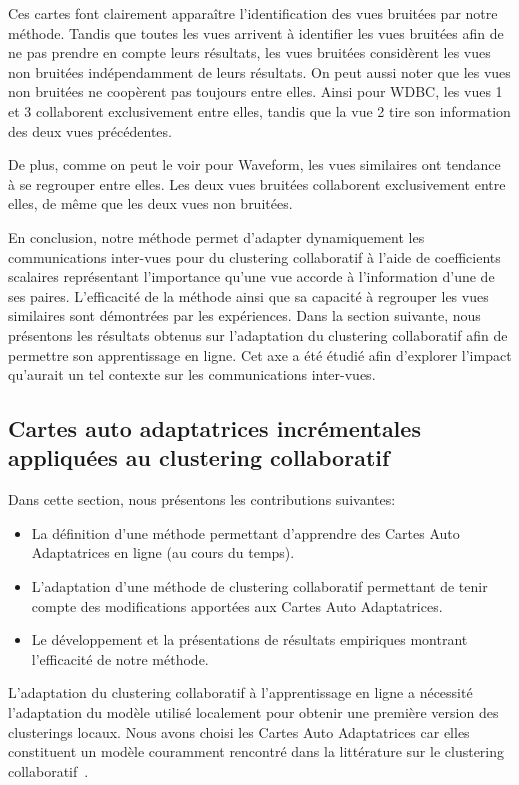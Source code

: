 Ces cartes font clairement apparaître l'identification des vues bruitées par notre méthode. Tandis que toutes les vues arrivent à identifier les vues bruitées afin de ne pas prendre en compte leurs résultats, les vues bruitées considèrent les vues non bruitées indépendamment de leurs résultats. On peut aussi noter que les vues non bruitées ne coopèrent pas toujours entre elles. Ainsi pour WDBC, les vues 1 et 3 collaborent exclusivement entre elles, tandis que la vue 2 tire son information des deux vues précédentes.

De plus, comme on peut le voir pour Waveform, les vues similaires ont tendance à se regrouper entre elles. Les deux vues bruitées collaborent exclusivement entre elles, de m\^{e}me que les deux vues non bruitées.

En conclusion, notre méthode permet d'adapter dynamiquement les communications inter-vues pour du clustering collaboratif à l'aide de coefficients scalaires représentant l'importance qu'une vue accorde à l'information d'une de ses paires. L'efficacité de la méthode ainsi que sa capacité à regrouper les vues similaires sont démontrées par les expériences. Dans la section suivante, nous présentons les résultats obtenus sur l'adaptation du clustering collaboratif afin de permettre son apprentissage en ligne. Cet axe a été étudié afin d'explorer l'impact qu'aurait un tel contexte sur les communications inter-vues.

\subsection{Cartes auto adaptatrices incr\'{e}mentales appliqu\'{e}es au clustering collaboratif}

Dans cette section, nous présentons les contributions suivantes:
\begin{itemize}
    \item La définition d'une méthode permettant d'apprendre des Cartes Auto Adaptatrices en ligne (au cours du temps).
    \item L'adaptation d'une méthode de clustering collaboratif permettant de tenir compte des modifications apportées aux Cartes Auto Adaptatrices.
    \item Le développement et la présentations de résultats empiriques montrant l'efficacité de notre méthode.
\end{itemize}

L'adaptation du clustering collaboratif à l'apprentissage en ligne a nécessité l'adaptation du modèle utilisé localement pour obtenir une première version des clusterings locaux. Nous avons choisi les Cartes Auto Adaptatrices car elles constituent un modèle couramment rencontré dans la littérature sur le clustering collaboratif~\cite{grozavu2010topological,ghassany2012collaborative,rastin2015collaborative}.

